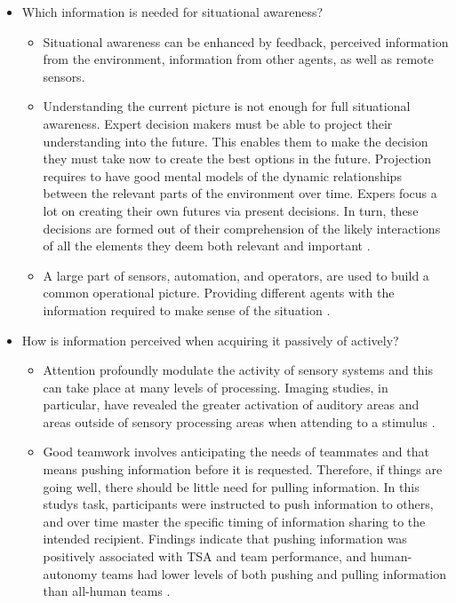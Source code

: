\begin{itemize}
	\item Which information is needed for situational awareness?
	\begin{itemize}
		\item Situational awareness can be enhanced by feedback, perceived information from the environment, information from other agents, as well as remote sensors. \cite{Carver2007}
		\item Understanding the current picture is not enough for full situational awareness. Expert decision makers must be able to project their understanding into the future. This enables them to make the decision they must take now to create the best options in the future. Projection requires to have good mental models of the dynamic relationships between the relevant parts of the environment over time. Expers focus a lot on creating their own futures via present decisions. In turn, these decisions are formed out of their comprehension of the likely interactions of all the elements they deem both relevant and important \cite{Gregory2010}.
		\item A large part of sensors, automation, and operators, are used to build a common operational picture. Providing different agents with the information required to make sense of the situation \cite{Neerincx2008}.
	\end{itemize}
	
	\item How is information perceived when acquiring it passively of actively?
	\begin{itemize}
		\item Attention profoundly modulate the activity of sensory systems and this can take place at many levels of processing. Imaging studies, in particular, have revealed the greater activation of auditory areas and areas outside of sensory processing areas when attending to a stimulus \cite{Palmer2007}.
		\item Good teamwork involves anticipating the needs of teammates and that means pushing information before it is requested. Therefore, if things are going well, there should be little need for pulling information. In this studys task, participants were instructed to push information to others, and over time master the specific timing of information sharing to the intended recipient. Findings indicate that pushing information was positively associated with TSA and team performance, and human-autonomy teams had lower levels of both pushing and pulling information than all-human teams \cite{Demir2017}.
	\end{itemize}
	

\end{itemize}
